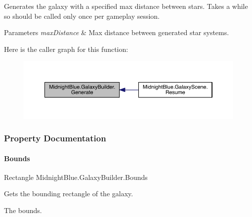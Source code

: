 Generates the galaxy with a specified max distance between stars. Takes a while so should be called only once per gameplay session. 


\begin{DoxyParams}{Parameters}
{\em max\+Distance} & Max distance between generated star systems.\\
\hline
\end{DoxyParams}
Here is the caller graph for this function\+:\nopagebreak
\begin{figure}[H]
\begin{center}
\leavevmode
\includegraphics[width=350pt]{class_midnight_blue_1_1_galaxy_builder_aaa080e0108cf02709137b7eebb56ad1a_icgraph}
\end{center}
\end{figure}


\subsubsection{Property Documentation}
\hypertarget{class_midnight_blue_1_1_galaxy_builder_a9051fa0f379b34dae5a6dcd287da7d9d}{}\label{class_midnight_blue_1_1_galaxy_builder_a9051fa0f379b34dae5a6dcd287da7d9d} 
\paragraph{\texorpdfstring{Bounds}{Bounds}}
{\footnotesize\ttfamily Rectangle Midnight\+Blue.\+Galaxy\+Builder.\+Bounds\hspace{0.3cm}{\ttfamily [get]}}



Gets the bounding rectangle of the galaxy. 

The bounds.\hypertarget{class_midnight_blue_1_1_galaxy_builder_a4b496c6930a56d2469c21acb54ff23ec}{}\label{class_midnight_blue_1_1_galaxy_builder_a4b496c6930a56d2469c21acb54ff23ec} 
